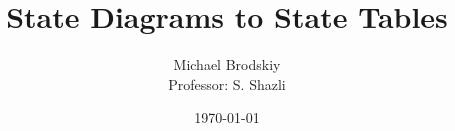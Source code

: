 


\pagestyle{fancy}

\title{State Diagrams to State Tables}
\date{\today}
\author{Michael Brodskiy\\ \small Professor: S. Shazli}



\maketitle

\thispagestyle{fancy}

\newpage


